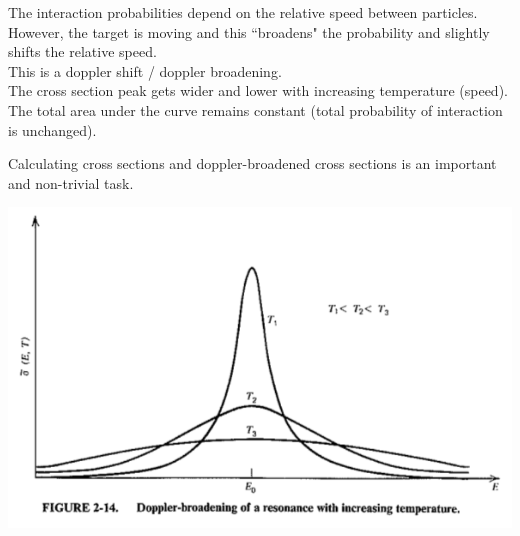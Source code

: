 \documentclass[12pt]{article}
\begin{document}
The interaction probabilities depend on the relative speed between particles.\\
However, the target is moving and this ``broadens" the probability and slightly shifts the relative speed.\\
This is a doppler shift / doppler broadening.\\
The cross section peak gets wider and lower with increasing temperature (speed).\\
The total area under the curve remains constant (total probability of interaction is unchanged).

Calculating cross sections and doppler-broadened cross sections is an important and non-trivial task.

\begin{center}
\includegraphics[height=2.5 in]{../figs/doppler}
\end{center}
\end{document}
